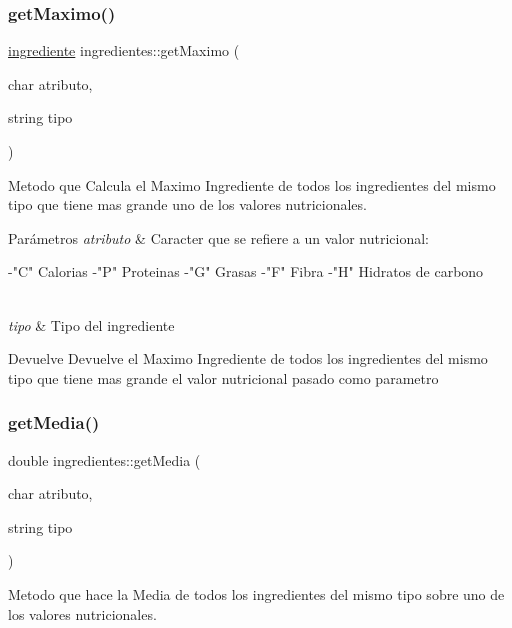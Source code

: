 \subsubsection{\texorpdfstring{get\+Maximo()}{getMaximo()}}
{\footnotesize\ttfamily \hyperlink{classingrediente}{ingrediente} ingredientes\+::get\+Maximo (\begin{DoxyParamCaption}\item[{char}]{atributo,  }\item[{string}]{tipo }\end{DoxyParamCaption})}



Metodo que Calcula el Maximo Ingrediente de todos los ingredientes del mismo tipo que tiene mas grande uno de los valores nutricionales. 


\begin{DoxyParams}{Parámetros}
{\em atributo} & Caracter que se refiere a un valor nutricional\+: \begin{DoxyVerb}    -"C" Calorias
    -"P" Proteinas
    -"G" Grasas
    -"F" Fibra
    -"H" Hidratos de carbono
\end{DoxyVerb}
\\
\hline
{\em tipo} & Tipo del ingrediente \\
\hline
\end{DoxyParams}
\begin{DoxyReturn}{Devuelve}
Devuelve el Maximo Ingrediente de todos los ingredientes del mismo tipo que tiene mas grande el valor nutricional pasado como parametro 
\end{DoxyReturn}
\mbox{\label{classingredientes_aa124bb75b0ff0b233d313fce58668868}} 
\subsubsection{\texorpdfstring{get\+Media()}{getMedia()}}
{\footnotesize\ttfamily double ingredientes\+::get\+Media (\begin{DoxyParamCaption}\item[{char}]{atributo,  }\item[{string}]{tipo }\end{DoxyParamCaption})}



Metodo que hace la Media de todos los ingredientes del mismo tipo sobre uno de los valores nutricionales. 


